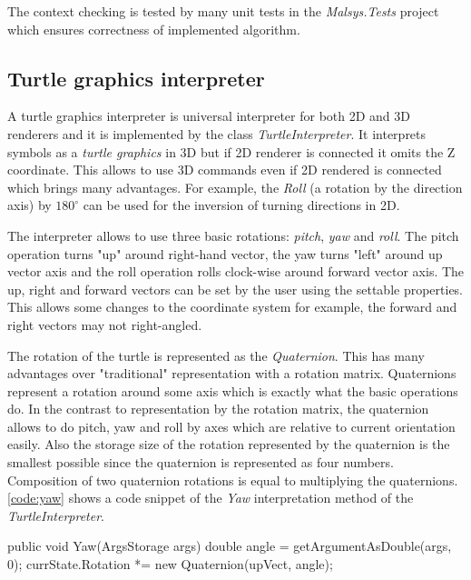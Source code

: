The context checking is tested by many unit tests in the \emph{Malsys.Tests} project which ensures correctness of implemented algorithm.


\subsection{Turtle graphics interpreter}

A turtle graphics interpreter is universal interpreter for both 2D and 3D renderers and it is implemented by the class \emph{TurtleInterpreter}.
It interprets \lsystem symbols as a \emph{turtle graphics} in 3D but if 2D renderer is connected it omits the Z coordinate.
This allows to use 3D commands even if 2D rendered is connected which brings many advantages.
For example, the \emph{Roll} (a rotation by the direction axis) by $180^{\circ}$ can be used for the inversion of turning directions in 2D.

The interpreter allows to use three basic rotations: \emph{pitch}, \emph{yaw} and \emph{roll}.
The pitch operation turns "up" around right-hand vector, the yaw turns "left" around up vector axis and the roll operation rolls clock-wise around forward vector axis.
The up, right and forward vectors can be set by the user using the settable properties.
This allows some changes to the coordinate system for example, the forward and right vectors may not right-angled.

The rotation of the turtle is represented as the \emph{Quaternion}.
This has many advantages over "traditional" representation with a rotation matrix.
Quaternions represent a rotation around some axis which is exactly what the basic operations do.
In the contrast to representation by the rotation matrix, the quaternion allows to do pitch, yaw and roll by axes which are relative to current orientation easily.
Also the storage size of the rotation represented by the quaternion is the smallest possible since the quaternion is represented as four numbers.
Composition of two quaternion rotations is equal to multiplying the quaternions.
\autoref{code:yaw} shows a code snippet of the \emph{Yaw} interpretation method of the \emph{TurtleInterpreter}.


\begin{Csharp}[label=code:yaw,caption={Implementation of the \emph{Yaw} method of the \emph{TurtleInterpreter}}]
[SymbolInterpretation(1)]
public void Yaw(ArgsStorage args) {
	double angle = getArgumentAsDouble(args, 0);
	currState.Rotation *= new Quaternion(upVect, angle);
}
\end{Csharp}



